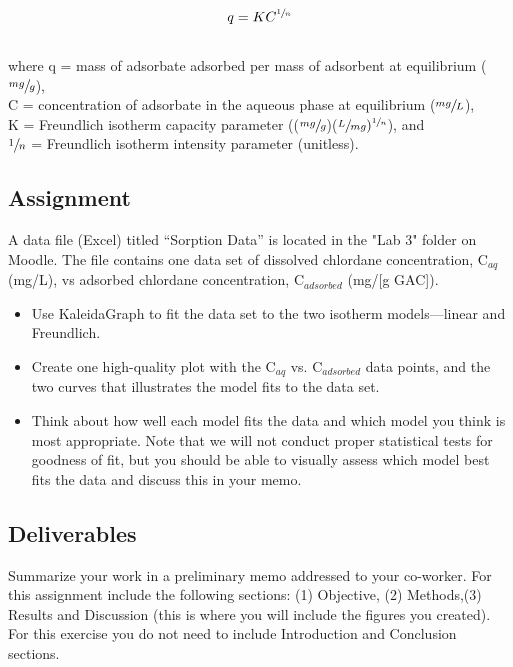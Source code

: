 \documentclass[12pt,letterpaper]{article}
\begin{document}
\begin{equation}
q = KC^{\sfrac{1}{n}}
\end{equation}\\

where q = mass of adsorbate adsorbed per mass of adsorbent at equilibrium ($\sfrac{mg}{g}$),\\

C = concentration of adsorbate in the aqueous phase at equilibrium ($\sfrac{mg}{L}$),\\

K = Freundlich isotherm capacity parameter (($\sfrac{mg}{g}$)($\sfrac{L}{mg})^{\sfrac{1}{n}}$), and\\

$\sfrac{1}{n}$ = Freundlich isotherm intensity parameter (unitless).\\


\subsection *{Assignment}

A data file (Excel) titled ``Sorption Data'' is located in the "Lab 3" folder on Moodle.  
The file contains one data set of dissolved chlordane concentration, C$_{aq}$ (mg/L), vs adsorbed chlordane concentration, C$_{adsorbed}$ (mg/[g GAC]).

\begin{itemize} 
\item Use KaleidaGraph to fit the data set to  the two isotherm models---linear and Freundlich.
\item Create one high-quality plot with the C$_{aq}$ vs. C$_{adsorbed}$ data points, and the two curves that illustrates the model fits to the data set. 
\item Think about how well each model fits the data and which model you think is most  appropriate. Note that we will not conduct proper statistical tests for goodness of fit, but you should be able to visually assess which model best fits the data and discuss this in your memo.
 
\end{itemize}


\subsection *{Deliverables}
Summarize your work in a preliminary memo addressed to your co-worker. For this assignment include the following sections: (1) Objective, (2) Methods,(3) Results and Discussion (this is where you will include the figures you created).  For this exercise you do not need to include Introduction and Conclusion sections.\\
\end{document}
